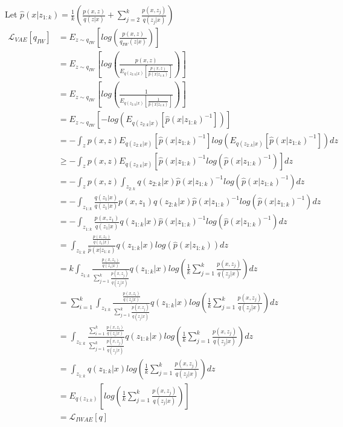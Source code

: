 \documentclass{article} %
\begin{document}
Let $\hat{p}(x|z_{1:k})=\frac{1}{k} \left( \frac{p(x,z)}{q(z|x)}+ \sum_{j=2}^k \frac{p(x,z_j)}{q(z_j|x)} \right)$
\begin{align} 
    \mathcal{L}_{VAE}[q_{IW}] &= E_{z \sim q_{IW}} \left[ log \left( \frac{p(x,z)}{q_{IW}(z|x)} \right) \right] \\
    &= E_{z \sim q_{IW}} \left[ log \left( \frac{p(x,z)}{E_{q(z_{2:k} |x)} \left[ \frac{p(x,z)}{ \hat{p}(x|z_{1:k})} \right]}  \right) \right] \\
    &= E_{z \sim q_{IW}} \left[ log \left( \frac{1}{E_{q(z_{2:k} |x)} \left[ \frac{1}{ \hat{p}(x|z_{1:k}) } \right]}  \right) \right] \\
    &= E_{z \sim q_{IW}} \left[ - log \left( E_{q(z_{2:k} |x)} \left[  \hat{p}(x|z_{1:k})^{-1} \right] \right) \right] \\   
    &= - \int_{z} p(x,z) E_{q(z_{2:k} |x)} \left[  \hat{p}(x|z_{1:k})^{-1} \right] log \left( E_{q(z_{2:k} |x)} \left[  \hat{p}(x|z_{1:k})^{-1} \right] \right) dz \\  
    &\geq - \int_{z} p(x,z) E_{q(z_{2:k} |x)} \left[  \hat{p}(x|z_{1:k})^{-1} log \left(  \hat{p}(x|z_{1:k})^{-1} \right) \right]  dz \label{geq} \\   
    &= - \int_{z} p(x,z) \int_{z_{2:k}} q(z_{2:k} |x) \hat{p}(x|z_{1:k})^{-1} log \left(  \hat{p}(x|z_{1:k})^{-1} \right)  dz \\  
    &= - \int_{z_{1:k}}  \frac{q(z_1|x)}{q(z_1|x)} p(x,z_1)  q(z_{2:k} |x)  \hat{p}(x|z_{1:k})^{-1} log \left(  \hat{p}(x|z_{1:k})^{-1} \right)   dz \label{z1} \\ 
    &= - \int_{z_{1:k}}  \frac{p(x,z_1)}{q(z_1|x)}   q(z_{1:k} |x)  \hat{p}(x|z_{1:k})^{-1} log \left(  \hat{p}(x|z_{1:k})^{-1} \right)   dz \\ 
    &= \int_{z_{1:k}}  \frac{\frac{p(x,z_1)}{q(z_1|x)}}{\hat{p}(x|z_{1:k})}     q(z_{1:k} |x)  log \left(  \hat{p}(x|z_{1:k}) \right)   dz \\ 
    &= k \int_{z_{1:k}}  \frac{\frac{p(x,z_1)}{q(z_1|x)}}{ \sum_{j=1}^k \frac{p(x,z_j)}{q(z_j|x)} }     q(z_{1:k} |x)  log \left(  \frac{1}{k} \sum_{j=1}^k \frac{p(x,z_j)}{q(z_j|x)} \right)   dz \\ 
    &= \sum_{i=1}^{k} \int_{z_{1:k}}  \frac{\frac{p(x,z_i)}{q(z_i|x)}}{ \sum_{j=1}^k \frac{p(x,z_j)}{q(z_j|x)} }     q(z_{1:k} |x)  log \left(  \frac{1}{k} \sum_{j=1}^k \frac{p(x,z_j)}{q(z_j|x)} \right)   dz \label{sum} \\ 
    &=  \int_{z_{1:k}}  \frac{ \sum_{i=1}^{k} \frac{p(x,z_i)}{q(z_i|x)}}{ \sum_{j=1}^k \frac{p(x,z_j)}{q(z_j|x)} }     q(z_{1:k} |x)  log \left(  \frac{1}{k} \sum_{j=1}^k \frac{p(x,z_j)}{q(z_j|x)} \right)   dz \\
    &=  \int_{z_{1:k}} q(z_{1:k} |x)  log \left(  \frac{1}{k} \sum_{j=1}^k \frac{p(x,z_j)}{q(z_j|x)} \right)   dz \\
    &= E_{q(z_{1:k})} \left[ log \left(  \frac{1}{k} \sum_{j=1}^k \frac{p(x,z_j)}{q(z_j|x)} \right)  \right] \\
    &= \mathcal{L}_{IWAE}[q] 
\end{align}
\end{document}
